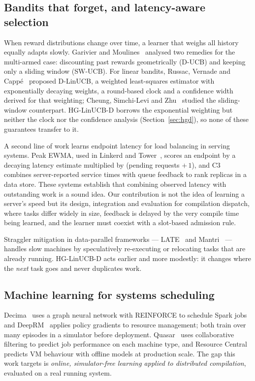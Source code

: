 \documentclass[final,5p,times,twocolumn]{elsarticle}
\begin{document}
\subsection{Bandits that forget, and latency-aware selection}

When reward distributions change over time, a learner that weighs all history equally adapts slowly. Garivier and Moulines~\cite{garivier2011} analysed two remedies for the multi-armed case: discounting past rewards geometrically (D-UCB) and keeping only a sliding window (SW-UCB). For linear bandits, Russac, Vernade and Capp\'e~\cite{russac2019} proposed D-LinUCB, a weighted least-squares estimator with exponentially decaying weights, a round-based clock and a confidence width derived for that weighting; Cheung, Simchi-Levi and Zhu~\cite{cheung2019} studied the sliding-window counterpart. HG-LinUCB-D borrows the exponential weighting but neither the clock nor the confidence analysis (Section~\ref{sec:hgd}), so none of these guarantees transfer to it.

A second line of work learns endpoint latency for load balancing in serving systems. Peak EWMA, used in Linkerd and Tower~\cite{linkerd2016,towerpeak}, scores an endpoint by a decaying latency estimate multiplied by (pending requests $+\,1$), and C3~\cite{c3} combines server-reported service times with queue feedback to rank replicas in a data store. These systems establish that combining observed latency with outstanding work is a sound idea. Our contribution is not the idea of learning a server's speed but its design, integration and evaluation for compilation dispatch, where tasks differ widely in size, feedback is delayed by the very compile time being learned, and the learner must coexist with a slot-based admission rule.

Straggler mitigation in data-parallel frameworks --- LATE~\cite{late} and Mantri~\cite{mantri} --- handles slow machines by speculatively re-executing or relocating tasks that are already running. HG-LinUCB-D acts earlier and more modestly: it changes where the \emph{next} task goes and never duplicates work.

\subsection{Machine learning for systems scheduling}

Decima~\cite{decima} uses a graph neural network with REINFORCE to schedule Spark jobs and DeepRM~\cite{deeprm} applies policy gradients to resource management; both train over many episodes in a simulator before deployment. Quasar~\cite{quasar} uses collaborative filtering to predict job performance on each machine type, and Resource Central~\cite{resourcecentral} predicts VM behaviour with offline models at production scale. The gap this work targets is \emph{online, simulator-free learning applied to distributed compilation}, evaluated on a real running system.
\end{document}
